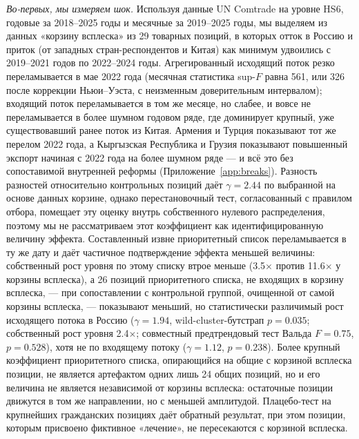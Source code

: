 \documentclass[12pt]{article}
\begin{document}
\emph{Во-первых, мы измеряем шок.} Используя данные UN Comtrade на уровне HS6, годовые за
2018--2025 годы и месячные за 2019--2025 годы, мы выделяем из данных «корзину всплеска» из
29 товарных позиций, в которых отток в Россию и приток (от западных стран-респондентов и
Китая) как минимум удвоились с 2019--2021 годов по 2022--2024 годы. Агрегированный
исходящий поток резко переламывается в мае 2022 года (месячная статистика sup-$F$ равна
561, или 326 после коррекции Ньюи--Уэста, с неизменным доверительным интервалом); входящий
поток переламывается в том же месяце, но слабее, и вовсе не переламывается в более шумном
годовом ряде, где доминирует крупный, уже существовавший ранее поток из Китая. Армения и
Турция показывают тот же перелом 2022 года, а Кыргызская Республика и Грузия показывают
повышенный экспорт начиная с 2022 года на более шумном ряде — и всё это без сопоставимой
внутренней реформы (Приложение~\ref{app:breaks}). Разность разностей относительно
контрольных позиций даёт $\gamma = 2.44$ по выбранной на основе данных корзине, однако
перестановочный тест, согласованный с правилом отбора, помещает эту оценку внутрь
собственного нулевого распределения, поэтому мы не рассматриваем этот коэффициент как
идентифицированную величину эффекта. Составленный извне приоритетный список переламывается
в ту же дату и даёт частичное подтверждение эффекта меньшей величины: собственный рост
уровня по этому списку втрое меньше (3.5$\times$ против 11.6$\times$ у корзины всплеска), а
26 позиций приоритетного списка, не входящих в корзину всплеска, — при сопоставлении с
контрольной группой, очищенной от самой корзины всплеска, — показывают меньший, но
статистически различимый рост исходящего потока в Россию ($\gamma = 1.94$,
wild-cluster-бутстрап $p = 0.035$; собственный рост уровня 2.4$\times$; совместный
предтрендовый тест Вальда $F = 0.75$, $p = 0.528$), хотя не по входящему потоку
($\gamma = 1.12$, $p = 0.238$). Более крупный коэффициент приоритетного списка,
опирающийся на общие с корзиной всплеска позиции, не является артефактом одних лишь 24
общих позиций, но и его величина не является независимой от корзины всплеска: остаточные
позиции движутся в том же направлении, но с меньшей амплитудой. Плацебо-тест на крупнейших
гражданских позициях даёт обратный результат, при этом позиции, которым присвоено фиктивное
«лечение», не пересекаются с корзиной всплеска.
\end{document}
